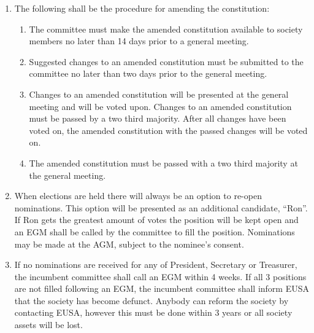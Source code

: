 \begin{enumerate}
\item The following shall be the procedure for amending the constitution:
  \begin{enumerate}
  \item The committee must make the amended constitution available to society members no later than 14 days prior to a general meeting.
  \item Suggested changes to an amended constitution must be submitted to the committee no later than two days prior to the general meeting.
  \item Changes to an amended constitution will be presented at the general meeting and will be voted upon. Changes to an amended constitution must be passed by a two third majority. After all changes have been voted on, the amended constitution with the passed changes will be voted on.
  \item The amended constitution must be passed with a two third majority at the general meeting.
  \end{enumerate}

\item When elections are held there will always be an option to re-open nominations. This option will be presented as an additional candidate, \enquote{Ron}. If Ron gets the greatest amount of votes the position will be kept open and an EGM shall be called by the committee to fill the position. Nominations may be made at the AGM, subject to the nominee's consent.

\item If no nominations are received for any of President, Secretary or Treasurer, the incumbent committee shall call an EGM within 4 weeks. If all 3 positions are not filled following an EGM, the incumbent committee shall inform EUSA that the society has become defunct. Anybody can reform the society by contacting EUSA, however this must be done within 3 years or all society assets will be lost.

\end{enumerate}
